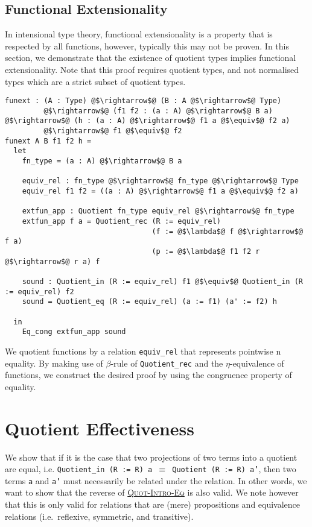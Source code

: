 \documentclass[12pt,twoside,maitrise]{dms}
\theoremstyle{definition}
\numberwithin{equation}{section}
\numberwithin{table}{chapter}
\numberwithin{figure}{chapter}
\newcommand\id[1] {\texttt{#1}}
\newcommand\fn[1] {\texttt{#1}}
\begin{document}
\section{Functional Extensionality}\label{sec:quot-implies-funext}

In intensional type theory, functional extensionality is a property that is
respected by all functions, however, typically this may not be proven. In this
section, we demonstrate that the existence of quotient types implies functional
extensionality. Note that this proof requires quotient types, and not normalised
types which are a strict subset of quotient types.

\begin{verbatim}
funext : (A : Type) @$\rightarrow$@ (B : A @$\rightarrow$@ Type)
         @$\rightarrow$@ (f1 f2 : (a : A) @$\rightarrow$@ B a) @$\rightarrow$@ (h : (a : A) @$\rightarrow$@ f1 a @$\equiv$@ f2 a)
         @$\rightarrow$@ f1 @$\equiv$@ f2
funext A B f1 f2 h =
  let
    fn_type = (a : A) @$\rightarrow$@ B a

    equiv_rel : fn_type @$\rightarrow$@ fn_type @$\rightarrow$@ Type
    equiv_rel f1 f2 = ((a : A) @$\rightarrow$@ f1 a @$\equiv$@ f2 a)

    extfun_app : Quotient fn_type equiv_rel @$\rightarrow$@ fn_type
    extfun_app f a = Quotient_rec (R := equiv_rel)
                                  (f := @$\lambda$@ f @$\rightarrow$@ f a)
                                  (p := @$\lambda$@ f1 f2 r @$\rightarrow$@ r a) f

    sound : Quotient_in (R := equiv_rel) f1 @$\equiv$@ Quotient_in (R := equiv_rel) f2
    sound = Quotient_eq (R := equiv_rel) (a := f1) (a' := f2) h

  in
    Eq_cong extfun_app sound
\end{verbatim}

We quotient functions by a relation \id{equiv\_rel} that represents pointwise
n
equality. By making use of $\beta$-rule of \id{Quotient\_rec} and the
$\eta$-equivalence of functions, we construct the desired proof by using the
congruence property of equality.

\chapter{Quotient Effectiveness}\label{ch:quotient-effectiveness}

We show that if it is the case that two projections of two terms into a quotient
are equal, i.e. \fn{Quotient_in (R := R) a $\equiv$ Quotient (R := R) a'}, then
two terms \id{a} and \id{a'} must necessarily be related under the relation. In
other words, we want to show that the reverse of
\hyperref[quot-intro-eq-rule]{\textsc{Quot-Intro-Eq}} is also valid. We note
however that this is only valid for relations that are (mere) propositions and
equivalence relations (i.e.\ reflexive, symmetric, and transitive).
\end{document}
